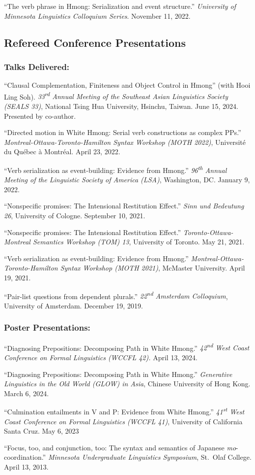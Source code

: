 \documentclass[11pt,oneside,DIV=calc,parskip=off]{scrarticle} %
\newlength{\spacingbefore}
\newlength{\spacingafter}
\newcommand{\myonecol}[1]{%
	\vspace{\spacingbefore}%
	\begin{minipage}[t]{\linewidth}%
		\strut#1%
	\end{minipage}%
	\vspace{\spacingafter}\par%
	}
\newcommand{\talk}[1]{%
	\myonecol{#1}%
	}
\begin{document}
\talk{``The verb phrase in Hmong: Serialization and event structure.'' \textit{University of Minnesota Linguistics Colloquium Series}. November 11, 2022.}


\subsection{Refereed Conference Presentations}
\subsubsection{Talks Delivered:}
\talk{``Clausal Complementation, Finiteness and Object Control in Hmong'' (with Hooi Ling Soh). \textit{33\textsuperscript{rd} Annual Meeting of the Southeast Asian Linguistics Society (SEALS 33)}, National Tsing Hua University, Hsinchu, Taiwan. June 15, 2024. Presented by co-author.}
\talk{``Directed motion in White Hmong: Serial verb constructions as complex PPs.'' \textit{Montreal-Ottawa-Toronto-Hamilton Syntax Workshop (MOTH 2022)}, Universit\'e du Qu\'ebec \`a Montr\'eal. April 23, 2022.}
\talk{``Verb serialization as event-building: Evidence from Hmong.'' \textit{96\textsuperscript{th} Annual Meeting of the Linguistic Society of America (LSA)}, Washington, DC. January 9, 2022.}
\talk{``Nonspecific promises: The Intensional Restitution Effect.'' \textit{Sinn und Bedeutung 26}, University of Cologne. September 10, 2021.}
\talk{``Nonspecific promises: The Intensional Restitution Effect.'' \textit{Toronto-Ottawa-Montreal Semantics Workshop (TOM) 13}, University of Toronto. May 21, 2021.}
\talk{``Verb serialization as event-building: Evidence from Hmong.'' \textit{Montreal-Ottawa-Toronto-Hamilton Syntax Workshop (MOTH 2021)}, McMaster University. April 19, 2021.}
\talk{``Pair-list questions from dependent plurals.'' \textit{22\textsuperscript{nd} Amsterdam Colloquium}, University of Amsterdam. December 19, 2019.}

\subsubsection{Poster Presentations:}
\talk{``Diagnosing Prepositions: Decomposing Path in White Hmong.'' \textit{42\textsuperscript{nd} West Coast Conference on Formal Linguistics (WCCFL 42).} April 13, 2024.}
\talk{``Diagnosing Prepositions: Decomposing Path in White Hmong.'' \textit{Generative Linguistics in the Old World (GLOW) in Asia}, Chinese University of Hong Kong. March 6, 2024.}
\talk{``Culmination entailments in V and P: Evidence from White Hmong.'' \textit{41\textsuperscript{st} West Coast Conference on Formal Linguistics (WCCFL 41)}, University of California Santa Cruz. May 6, 2023}
\talk{``Focus, too, and conjunction, too: The syntax and semantics of Japanese \textit{mo}-coordination.'' \textit{Minnesota Undergraduate Linguistics Symposium}, St.\ Olaf College. April 13, 2013.}
\end{document}
